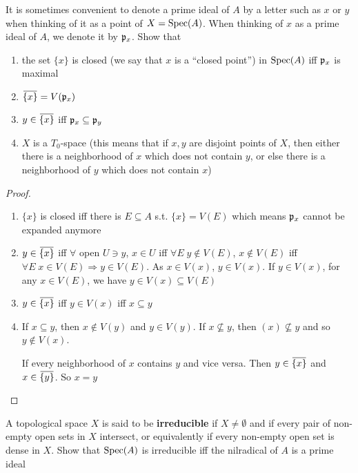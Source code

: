 \documentclass[11pt]{article}
\begin{document}
\begin{exercise}
\label{ex1.18}
It is sometimes convenient to denote a prime ideal of \(A\) by a letter such as \(x\) or \(y\)
when thinking of it as a point of \(X=\operatorname{Spec}(A)\). When thinking of \(x\) as a prime ideal
of \(A\), we denote it by \(\mathfrak{p}_x\). Show that
\begin{enumerate}
\item the set \(\{x\}\) is closed (we say that \(x\) is a ``closed point'') in \(\operatorname{Spec}(A)\) iff \(\mathfrak{p}_x\)
is maximal
\item \(\bbar{\{x\}}=V(\fp_x)\)
\item \(y\in\bbar{\{x\}}\) iff \(\mathfrak{p}_x\subseteq\mathfrak{p}_y\)
\item \(X\) is a \(T_0\)-space (this means that if \(x,y\) are disjoint points of \(X\), then
either there is a neighborhood of \(x\) which does not contain \(y\), or else there is a
neighborhood of \(y\) which does not contain \(x\))
\end{enumerate}
\end{exercise}

\begin{proof}
\begin{enumerate}
\item \(\{x\}\) is closed iff there is \(E\subseteq A\) s.t. \(\{x\}=V(E)\) which means \(\mathfrak{p}_x\) cannot be
expanded anymore
\item \(y\in\bbar{\{x\}}\) iff \(\forall\) open \(U\ni y\), \(x\in U\) iff \(\forall E\; y\notin V(E)\), \(x\notin V(E)\) iff
\(\forall E\; x\in V(E)\Rightarrow y\in V(E)\). As \(x\in V(x)\), \(y\in V(x)\). If \(y\in V(x)\), for any \(x\in V(E)\),
we have \(y\in V(x)\subseteq V(E)\)
\item \(y\in\bbar{\{x\}}\) iff \(y\in V(x)\) iff \(x\subseteq y\)
\item If \(x\subseteq y\), then \(x\notin V(y)\) and \(y\in V(y)\). If \(x\not\subseteq y\), then \((x)\not\subseteq y\) and
so \(y\notin V(x)\).

If every neighborhood of \(x\) contains \(y\) and vice versa. Then \(y\in\bbar{\{x\}}\)
and \(x\in\bbar{\{y\}}\). So \(x=y\)
\end{enumerate}
\end{proof}

\begin{exercise}
\label{ex1.19}
A topological space \(X\) is said to be \textbf{irreducible} if \(X\neq\emptyset\) and if every pair of non-empty
open sets in \(X\) intersect, or equivalently if every non-empty open set is dense in \(X\).
Show that \(\operatorname{Spec}(A)\) is irreducible iff the nilradical of \(A\) is a prime ideal
\end{exercise}
\end{document}

